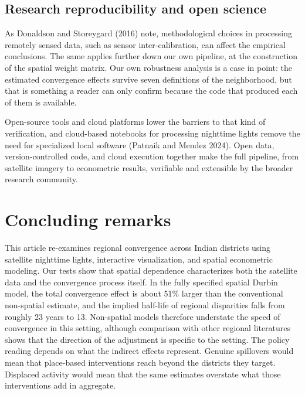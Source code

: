\documentclass[
  letterpaper,
  DIV=11,
  numbers=noendperiod]{scrartcl}
\begin{document}
\subsection{Research reproducibility and open
science}\label{research-reproducibility-and-open-science}

As Donaldson and Storeygard (2016) note, methodological choices in
processing remotely sensed data, such as sensor inter-calibration, can
affect the empirical conclusions. The same applies further down our own
pipeline, at the construction of the spatial weight matrix. Our own
robustness analysis is a case in point: the estimated convergence
effects survive seven definitions of the neighborhood, but that is
something a reader can only confirm because the code that produced each
of them is available.

Open-source tools and cloud platforms lower the barriers to that kind of
verification, and cloud-based notebooks for processing nighttime lights
remove the need for specialized local software (Patnaik and Mendez
2024). Open data, version-controlled code, and cloud execution together
make the full pipeline, from satellite imagery to econometric results,
verifiable and extensible by the broader research community.

\section{Concluding remarks}\label{concluding-remarks}

This article re-examines regional convergence across Indian districts
using satellite nighttime lights, interactive visualization, and spatial
econometric modeling. Our tests show that spatial dependence
characterizes both the satellite data and the convergence process
itself. In the fully specified spatial Durbin model, the total
convergence effect is about 51\% larger than the conventional
non-spatial estimate, and the implied half-life of regional disparities
falls from roughly 23 years to 13. Non-spatial models therefore
understate the speed of convergence in this setting, although comparison
with other regional literatures shows that the direction of the
adjustment is specific to the setting. The policy reading depends on
what the indirect effects represent. Genuine spillovers would mean that
place-based interventions reach beyond the districts they target.
Displaced activity would mean that the same estimates overstate what
those interventions add in aggregate.
\end{document}
